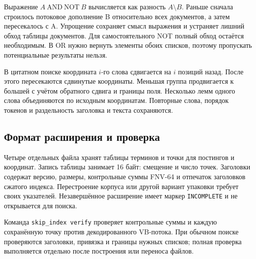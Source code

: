 \documentclass[12pt,a4paper]{article}
\begin{document}
Выражение $A\ \mathrm{AND}\ \mathrm{NOT}\ B$ вычисляется как разность $A\setminus B$.
Раньше сначала строилось потоковое дополнение B относительно всех документов,
а затем пересекалось с A. Упрощение сохраняет смысл выражения и устраняет
лишний обход таблицы документов. Для самостоятельного NOT полный обход
остаётся необходимым. В OR нужно вернуть элементы обоих списков, поэтому
пропускать потенциальные результаты нельзя.

В цитатном поиске координата $i$-го слова сдвигается на $i$ позиций назад.
После этого пересекаются сдвинутые координаты. Меньшая группа продвигается
к большей с учётом обратного сдвига и границы поля. Несколько лемм одного
слова объединяются по исходным координатам. Повторные слова, порядок токенов
и раздельность заголовка и текста сохраняются.

\subsection{Формат расширения и проверка}
Четыре отдельных файла хранят таблицы терминов и точки для постингов
и координат. Запись таблицы занимает 16 байт: смещение и число точек.
Заголовки содержат версию, размеры, контрольные суммы FNV-64 и отпечаток
заголовков сжатого индекса. Перестроение корпуса или другой вариант упаковки
требует своих указателей. Незавершённое расширение имеет маркер
\texttt{INCOMPLETE} и не открывается для поиска.

Команда \texttt{skip\_index verify} проверяет контрольные суммы и каждую
сохранённую точку против декодированного VB-потока. При обычном поиске
проверяются заголовки, привязка и границы нужных списков; полная проверка
выполняется отдельно после построения или переноса файлов.
\end{document}
